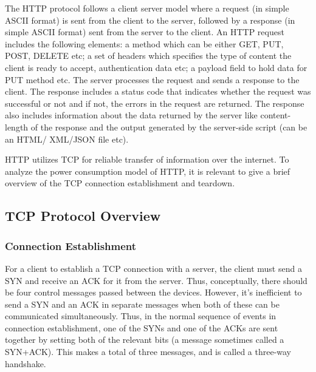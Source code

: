 \documentclass{sigplanconf}
\begin{document}
The HTTP protocol follows a client server model where a request (in simple ASCII format) is sent from the client to the server, followed by a response (in simple ASCII format) sent from the server to the client. An HTTP request includes the following elements: a method which can be either GET, PUT, POST, DELETE etc; a set of headers which specifies the type of content the client is ready to accept, authentication data etc; a payload field to hold data for PUT method etc. The server processes the request and sends a response to the client. The response includes a status code that indicates whether the request was successful or not and if not, the errors in the request are returned. The response also includes information about the data returned by the server like content-length of the response and the output generated by the server-side script (can be an HTML/ XML/JSON file etc). 

HTTP utilizes TCP for reliable transfer of information over the internet. To analyze the power consumption model of HTTP, it is relevant to give a brief overview of the TCP connection establishment and teardown.

\subsection{TCP Protocol Overview}

\subsubsection{Connection Establishment}

For a client to establish a TCP connection with a server, the client must send a SYN and receive an ACK for it from the server. Thus, conceptually, there should be four control messages passed between the devices. However, it's inefficient to send a SYN and an ACK in separate messages when both of these can be communicated simultaneously. Thus, in the normal sequence of events in connection establishment, one of the SYNs and one of the ACKs are sent together by setting both of the relevant bits (a message sometimes called a SYN+ACK). This makes a total of three messages, and is called a three-way handshake.
\end{document}

